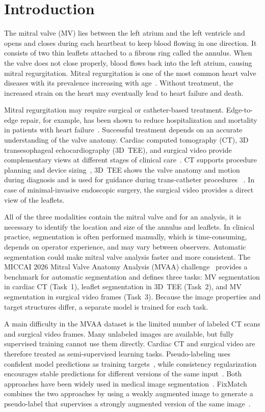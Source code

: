 \documentclass[runningheads]{llncs}
\begin{document}
\section{Introduction}

The mitral valve (MV) lies between the left atrium and the left
ventricle and opens and closes during each heartbeat to keep blood
flowing in one direction. It consists of two thin leaflets attached to
a fibrous ring called the annulus. When the valve does not close
properly, blood flows back into the left atrium, causing mitral
regurgitation. Mitral regurgitation is one of the most common heart
valve diseases with its prevalence increasing with age~\cite{ref_nkomo}.
Without treatment, the increased strain on the heart may eventually lead to heart failure and death.

Mitral regurgitation may require surgical or catheter-based treatment.
Edge-to-edge repair, for example, has been shown to reduce
hospitalization and mortality in patients with heart
failure~\cite{ref_coapt}. Successful treatment depends on an accurate
understanding of the valve anatomy. Cardiac computed tomography (CT),
3D transesophageal echocardiography (3D~TEE), and surgical video
provide complementary views at different stages of clinical
care~\cite{ref_zoghbi}. CT supports procedure planning and device
sizing~\cite{ref_ct}, 3D~TEE shows the valve anatomy and motion during diagnosis and
is used for guidance during trans-catheter procedures ~\cite{ref_tee3d}. In case of minimal-invasive endoscopic surgery, the surgical video provides a direct view of the leaflets.

All of the three modalities contain the mitral valve and for an analysis, it is necessary to identify the location and size of the annulus and
leaflets. In clinical practice, segmentation is often
performed manually, which is time-consuming, depends on operator experience, and
may vary between observers. Automatic segmentation could make mitral
valve analysis faster and more consistent. The MICCAI 2026 Mitral
Valve Anatomy Analysis (MVAA) challenge~\cite{ref_mvaa} provides a
benchmark for automatic segmentation and defines three tasks: MV
segmentation in cardiac CT (Task~1), leaflet segmentation in 3D~TEE
(Task~2), and MV segmentation in surgical video frames (Task~3).
Because the image properties and target structures differ, a separate
model is trained for each task.

A main difficulty in the MVAA dataset is the limited number of labeled
CT scans and surgical video frames. Many unlabeled images are
available, but fully supervised training cannot use them directly.
Cardiac CT and surgical video are therefore treated as
semi-supervised learning tasks. Pseudo-labeling uses confident model
predictions as training targets~\cite{ref_pseudo}, while consistency
regularization encourages stable predictions for different versions of
the same input~\cite{ref_meanteacher}. Both approaches have been widely
used in medical image segmentation~\cite{ref_bai,ref_uamt}. FixMatch
combines the two approaches by using a weakly augmented image to
generate a pseudo-label that supervises a strongly augmented version of
the same image~\cite{ref_fixmatch}.
\end{document}
